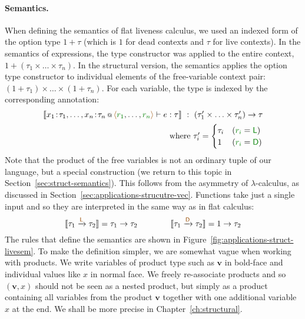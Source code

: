 \paragraph{Semantics.}
When defining the semantics of flat liveness calculus, we used an indexed form of the option type
$1 + \tau$ (which is $1$ for dead contexts and $\tau$ for live contexts). In the semantics of 
expressions, the type constructor was applied to the entire context, \ie~$1+(\tau_1 \times \ldots \times \tau_n)$.
In the structural version, the semantics applies the option type constructor to individual elements 
of the free-variable context pair: $(1+\tau_1) \times \ldots \times (1+ \tau_n)$. For each variable, 
the type is indexed by the corresponding annotation:
%
\begin{equation*}
\begin{array}{r}
\sem{\coctx{x_1\!:\!\tau_1, \ldots, x_n\!:\!\tau_n}{ \alift{\cclrd{r_1}, \ldots, \cclrd{r_n}} } \vdash e : \tau} 
  ~:~ (\tau'_1 \times \ldots \times \tau'_n) \rightarrow \tau\\[0.5em]
\textnormal{where}~\tau'_i = \begin{cases}
\tau_i & (\cclrd{r_i} = \cclrd{\ident{L}})\\
1      & (\cclrd{r_i} = \cclrd{\ident{D}})
\end{cases}
\end{array}
\end{equation*}
%
Note that the product of the free variables is not an ordinary tuple of our language, but a special
construction (we return to this topic in Section~\ref{sec:struct-semantics}). This follows from the 
asymmetry of $\lambda$-calculus, as discussed in Section~\ref{sec:applications-strucutre-vec}. Functions 
take just a single input and so they are interpreted in the same way as in flat calculus:
%
\begin{equation*}
\sem{\tau_1 \xrightarrow{\aclrd{\ident{L}}} \tau_2} = \tau_1 \rightarrow \tau_2 \qquad\qquad
\sem{\tau_1 \xrightarrow{\aclrd{\ident{D}}} \tau_2} = 1 \rightarrow \tau_2
\end{equation*}
%
The rules that define the semantics are shown in Figure~\ref{fig:applications-struct-livesem}.
To make the definition simpler, we are somewhat vague when working with products. We write 
variables of product type such as $\mathbf{v}$ in bold-face and individual values like $x$ in 
normal face. We freely re-associate products and so $(\mathbf{v}, x)$ should not be seen as a
nested product, but simply as a product containing all variables from the product $\mathbf{v}$ 
together with one additional variable $x$ at the end. We shall be more precise in 
Chapter~\ref{ch:structural}.

